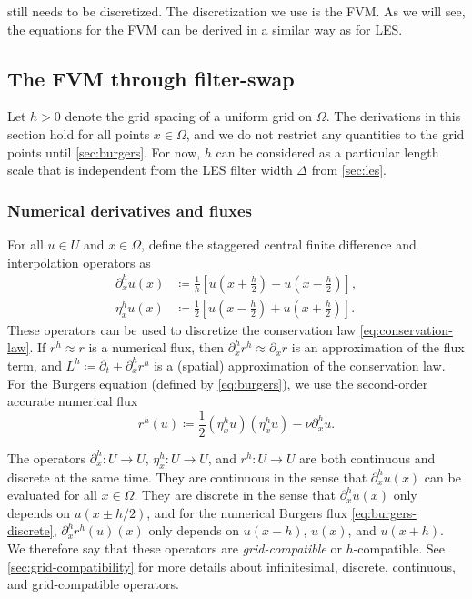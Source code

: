 \documentclass[preprint,twocolumn,5p]{elsarticle}
\begin{document}
 still needs to be discretized.
The discretization we use is the FVM.
As we will see, the equations for the FVM can be derived in a similar way as for LES.

\subsection{The FVM through filter-swap}
\label{sec:fvm}


Let $h > 0$ denote the grid spacing of a uniform grid on $\Omega$.
The derivations in this section hold for all points $x \in \Omega$,
and we do not restrict any quantities to the grid points
until \cref{sec:burgers}.
For now, $h$ can be considered as a particular
length scale that is independent from the LES filter width $\Delta$ from
\cref{sec:les}.

\subsubsection{Numerical derivatives and fluxes}


For all $u \in U$ and $x \in \Omega$,
define the staggered central finite difference and
interpolation operators as
\begin{align}
    \label{eq:cl-finite-difference} 
    \partial^h_x u(x)
    & \coloneq \frac{1}{h} \left[
        u\left(x + \frac{h}{2}\right) -
        u\left(x - \frac{h}{2}\right)
    \right], \\
    \label{eq:cl-interpolator}
    \eta^h_x u(x)
    & \coloneq \frac{1}{2} \left[
        u\left(x - \frac{h}{2}\right) +
        u\left(x + \frac{h}{2}\right)
    \right].
\end{align}
These operators can be used to discretize the
conservation law \eqref{eq:conservation-law}.
If $r^h \approx r$ is a numerical flux, then
$\partial^h_x r^h \approx \partial_x r$ is an approximation of the flux term,
and $L^h \coloneq \partial_t + \partial^h_x r^h$ is a
(spatial) approximation of the conservation law.
For the Burgers equation
(defined by \cref{eq:burgers}),
we use the second-order accurate numerical flux
\begin{equation}
    \label{eq:burgers-discrete}
    r^h(u)
    \coloneq \frac{1}{2} \left(\eta^h_x u\right) \left(\eta^h_x u\right)
    - \nu \partial^h_x u.
\end{equation}


The operators $\partial^h_x : U \to U$, $\eta^h_x : U \to U$, and $r^h : U \to U$
are both continuous and discrete at the same time.
They are continuous in the sense that $\partial^h_x u(x)$ can be evaluated for all $x \in \Omega$.
They are discrete in the sense that $\partial^h_x u(x)$ only depends on $u(x \pm h / 2)$,
and for the numerical Burgers flux \eqref{eq:burgers-discrete},
$\partial^h_x r^h(u)(x)$ only depends on $u(x - h)$, $u(x)$, and $u(x + h)$.
We therefore say that these operators are \emph{grid-compatible} or
$h$-compatible.
See \ref{sec:grid-compatibility} for more details about
infinitesimal, discrete, continuous, and grid-compatible operators.
\end{document}
